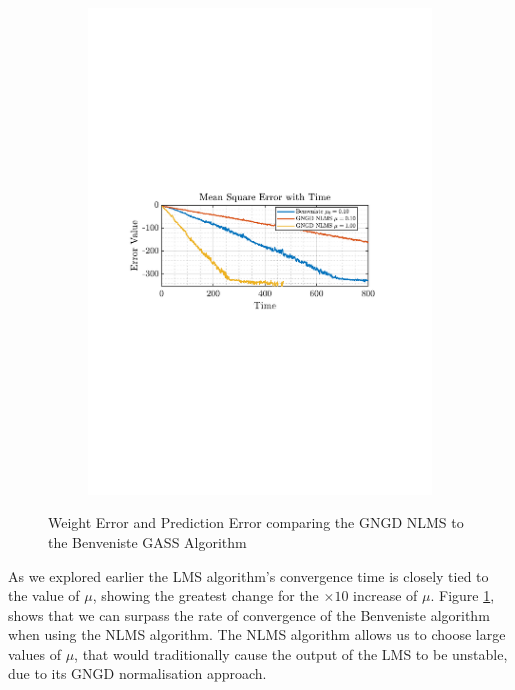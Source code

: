 \documentclass[12pt]{article}
\begin{document}
\begin{figure}[H]
\begin{subfigure}{0.49\textwidth}
					\includegraphics[trim={2.2cm 11.2cm 3.15cm  11.2cm}, clip, width=\textwidth]{../MATLAB/figures/q2_2c_fig04.pdf} 
					\captionsetup{justification=centering}
				\end{subfigure}
				\captionsetup{justification=centering}
				\caption{Weight Error and Prediction Error comparing the GNGD NLMS to the Benveniste GASS Algorithm}
				\label{fig: 2-2c}
			\end{figure}
		
			As we explored earlier the LMS algorithm's convergence time is closely tied to the value of $\mu$, showing the greatest change for the $\times10$ increase of $\mu$. Figure \ref{fig: 2-2c}, shows that we can surpass the rate of convergence of the Benveniste algorithm when using the NLMS algorithm. The NLMS algorithm allows us to choose large values of $\mu$, that would traditionally cause the output of the LMS to be unstable, due to its GNGD normalisation approach.
			
\end{document}

